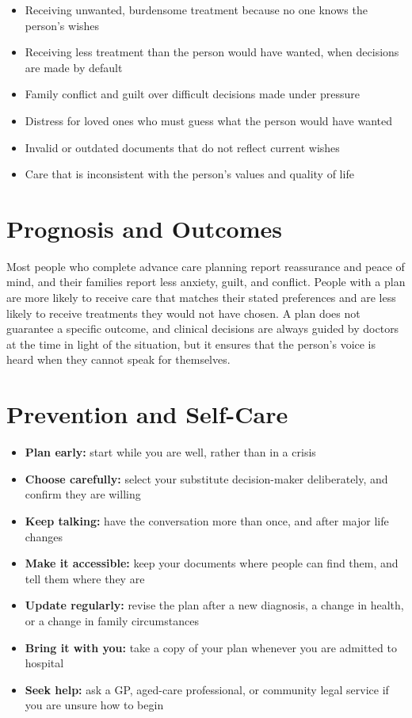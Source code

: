 \begin{itemize}
    \item Receiving unwanted, burdensome treatment because no one knows the person's wishes
    \item Receiving less treatment than the person would have wanted, when decisions are made by default
    \item Family conflict and guilt over difficult decisions made under pressure
    \item Distress for loved ones who must guess what the person would have wanted
    \item Invalid or outdated documents that do not reflect current wishes
    \item Care that is inconsistent with the person's values and quality of life
\end{itemize}

\section*{Prognosis and Outcomes}
Most people who complete advance care planning report reassurance and peace of mind, and their families report less anxiety, guilt, and conflict. People with a plan are more likely to receive care that matches their stated preferences and are less likely to receive treatments they would not have chosen. A plan does not guarantee a specific outcome, and clinical decisions are always guided by doctors at the time in light of the situation, but it ensures that the person's voice is heard when they cannot speak for themselves.

\section*{Prevention and Self-Care}
\begin{itemize}
    \item \textbf{Plan early:} start while you are well, rather than in a crisis
    \item \textbf{Choose carefully:} select your substitute decision-maker deliberately, and confirm they are willing
    \item \textbf{Keep talking:} have the conversation more than once, and after major life changes
    \item \textbf{Make it accessible:} keep your documents where people can find them, and tell them where they are
    \item \textbf{Update regularly:} revise the plan after a new diagnosis, a change in health, or a change in family circumstances
    \item \textbf{Bring it with you:} take a copy of your plan whenever you are admitted to hospital
    \item \textbf{Seek help:} ask a GP, aged-care professional, or community legal service if you are unsure how to begin
\end{itemize}

